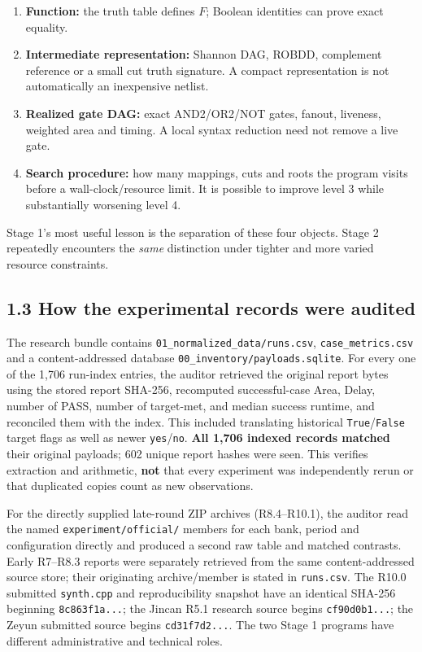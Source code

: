 \documentclass[a4paper,10pt]{article}
\providecommand{\tightlist}{\setlength{\itemsep}{0pt}\setlength{\parskip}{0pt}}
\theoremstyle{definition}
\theoremstyle{remark}
\begin{document}
\begin{enumerate}
\def\labelenumi{\arabic{enumi}.}
\tightlist
\item
  \textbf{Function:} the truth table defines \(F\); Boolean identities can prove exact equality.
\item
  \textbf{Intermediate representation:} Shannon DAG, ROBDD, complement reference or a small cut truth signature. A compact representation is not automatically an inexpensive netlist.
\item
  \textbf{Realized gate DAG:} exact AND2/OR2/NOT gates, fanout, liveness, weighted area and timing. A local syntax reduction need not remove a live gate.
\item
  \textbf{Search procedure:} how many mappings, cuts and roots the program visits before a wall-clock/resource limit. It is possible to improve level 3 while substantially worsening level 4.
\end{enumerate}

Stage 1's most useful lesson is the separation of these four objects. Stage 2 repeatedly encounters the \emph{same} distinction under tighter and more varied resource constraints.

\subsection{1.3 How the experimental records were audited}\label{how-the-experimental-records-were-audited}

The research bundle contains \texttt{01\_normalized\_data/runs.csv}, \texttt{case\_metrics.csv} and a content-addressed database \texttt{00\_inventory/payloads.sqlite}. For every one of the 1,706 run-index entries, the auditor retrieved the original report bytes using the stored report SHA-256, recomputed successful-case Area, Delay, number of PASS, number of target-met, and median success runtime, and reconciled them with the index. This included translating historical \texttt{True}/\texttt{False} target flags as well as newer \texttt{yes}/\texttt{no}. \textbf{All 1,706 indexed records matched} their original payloads; 602 unique report hashes were seen. This verifies extraction and arithmetic, \textbf{not} that every experiment was independently rerun or that duplicated copies count as new observations.

For the directly supplied late-round ZIP archives (R8.4--R10.1), the auditor read the named \texttt{experiment/official/} members for each bank, period and configuration directly and produced a second raw table and matched contrasts. Early R7--R8.3 reports were separately retrieved from the same content-addressed source store; their originating archive/member is stated in \texttt{runs.csv}. The R10.0 submitted \texttt{synth.cpp} and reproducibility snapshot have an identical SHA-256 beginning \texttt{8c863f1a...}; the Jincan R5.1 research source begins \texttt{cf90d0b1...}; the Zeyun submitted source begins \texttt{cd31f7d2...}. The two Stage 1 programs have different administrative and technical roles.
\end{document}
